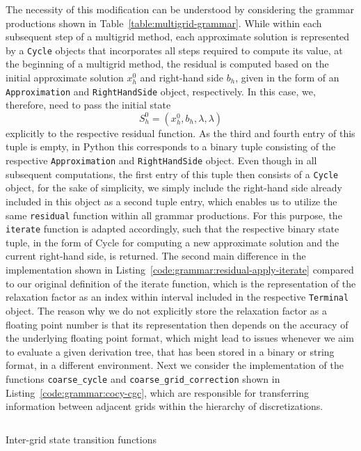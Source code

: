 The necessity of this modification can be understood by considering the grammar productions shown in Table~\ref{table:multigrid-grammar}.
While within each subsequent step of a multigrid method, each approximate solution is represented by a \texttt{Cycle} objects that incorporates all steps required to compute its value, at the beginning of a multigrid method, the residual is computed based on the initial approximate solution $x_h^0$ and right-hand side $b_h$, given in the form of an \texttt{Approximation} and \texttt{RightHandSide} object, respectively.
In this case, we, therefore, need to pass the initial state 
\begin{equation*}
	S_h^0 = (x_h^0, b_h, \lambda, \lambda)
\end{equation*} explicitly to the respective residual function.
As the third and fourth entry of this tuple is empty, in Python this corresponds to a binary tuple consisting of the respective \texttt{Approximation} and \texttt{RightHandSide} object.
Even though in all subsequent computations, the first entry of this tuple then consists of a \texttt{Cycle} object, for the sake of simplicity, we simply include the right-hand side already included in this object as a second tuple entry, which enables us to utilize the same \texttt{residual} function within all grammar productions.
For this purpose, the \texttt{iterate} function is adapted accordingly, such that the respective binary state tuple, in the form of Cycle for computing a new approximate solution and the current right-hand side, is returned.
The second main difference in the implementation shown in Listing~\ref{code:grammar:residual-apply-iterate} compared to our original definition of the iterate function, which is the representation of the relaxation factor as an index within interval included in the respective \texttt{Terminal} object.
The reason why we do not explicitly store the relaxation factor as a floating point number is that its representation then depends on the accuracy of the underlying floating point format, which might lead to issues whenever we aim to evaluate a given derivation tree, that has been stored in a binary or string format, in a different environment.
Next we consider the implementation of the functions \texttt{coarse\_cycle} and \texttt{coarse\_grid\_correction} shown in Listing~\ref{code:grammar:cocy-cgc}, which are responsible for transferring information between adjacent grids within the hierarchy of discretizations.
\begin{listing}
	\inputminted{python}{evostencils/grammar/cocy_cgc.py}
	\caption{Inter-grid state transition functions}
	\label{code:grammar:cocy-cgc}
\end{listing}
